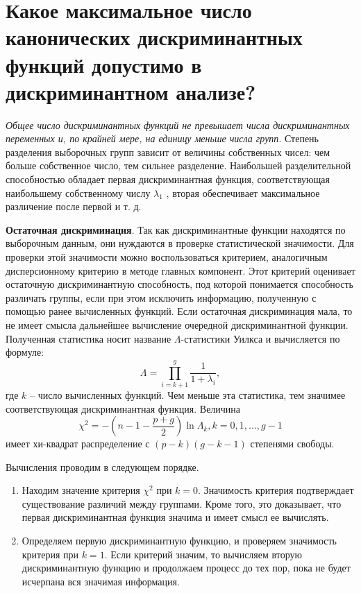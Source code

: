 \documentclass[a4paper, 12pt]{article}
\begin{document}
\section{Какое максимальное число канонических дискриминантных функций допустимо в дискриминантном анализе?}
\textit{Общее число дискриминантных функций не превышает числа дискриминантных переменных и, по крайней мере, на единицу меньше числа групп}. Степень разделения выборочных групп зависит от величины собственных чисел: чем больше собственное число, тем сильнее разделение. Наибольшей разделительной способностью обладает первая дискриминантная функция, соответствующая наибольшему собственному числу $\lambda_1$ , вторая обеспечивает максимальное различение после первой и т. д. 

\textbf{Остаточная дискриминация}. Так как дискриминантные функции находятся по выборочным данным, они нуждаются в проверке статистической значимости. Для проверки этой значимости можно воспользоваться критерием, аналогичным дисперсионному критерию в методе главных компонент. Этот критерий оценивает остаточную дискриминантную способность, под которой понимается способность различать группы, если при этом исключить информацию, полученную с помощью ранее вычисленных функций. Если остаточная дискриминация мала, то не имеет смысла дальнейшее вычисление очередной дискриминантной функции. Полученная статистика носит название $\Lambda$-статистики Уилкса и вычисляется по формуле:
 \begin{equation}
    \Lambda = \prod_{i=k+1}^g \dfrac{1}{1+\lambda_i}, 
 \end{equation}
где $k$ -- число вычисленных функций. Чем меньше эта статистика, тем значимее соответствующая дискриминантная функция. Величина
\begin{equation}
    \chi^2=-\left(n-1-\dfrac{p+g}{2}  \right) \ln \Lambda_k, k=0,1,\dots,g-1
\end{equation}
имеет хи-квадрат распределение с  $(p-k)(g-k-1)$ степенями свободы. 

Вычисления проводим в следующем порядке.
\begin{enumerate}
    \item Находим значение критерия  $\chi^2$ при $k = 0$. Значимость критерия подтверждает существование различий между группами. Кроме того, это доказывает, что первая дискриминантная функция значима и имеет смысл ее вычислять.
    \item Определяем первую дискриминантную функцию, и проверяем значимость критерия при $k = 1$. Если критерий значим, то вычисляем вторую дискриминантную функцию и продолжаем процесс до тех пор, пока не будет исчерпана вся значимая информация.
\end{enumerate}
\end{document}
